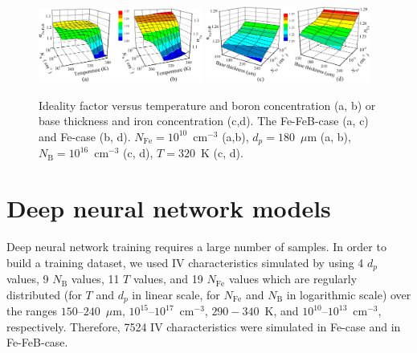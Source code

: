 \documentclass[num-refs]{wiley-article} %
\begin{document}
\begin{figure}[t]
\centering
\includegraphics[width=0.48\textwidth]{Fig2ab}
\includegraphics[width=0.48\textwidth]{Fig2cd}
\caption{Ideality factor versus temperature and boron concentration (a, b)
or base thickness and iron concentration (c,d).
The Fe-FeB-case (a, c) and Fe-case (b, d).
$N_\mathrm{Fe}=10^{10}$~cm$^{-3}$ (a,b),
$d_p=180$~$\mu$m (a, b),
$N_\mathrm{B}=10^{16}$~cm$^{-3}$ (c, d),
$T=320$~K (c, d).
}
\label{fig_nValues}
\end{figure}

\section{Deep neural network models}

Deep neural network training  requires a large number of samples.
In order to build a training dataset, we used IV characteristics
simulated by using 4 $d_p$ values, 9 $N_\mathrm{B}$ values, 11 $T$ values, and 19 $N_{\mathrm{Fe}}$ values
which are regularly distributed
(for $T$ and $d_p$ in linear scale,
for  $N_{\mathrm{Fe}}$ and $N_\mathrm{B}$ in logarithmic scale)
over the  ranges $150$--$240$~$\mu$m, $10^{15}$--$10^{17}$~cm$^{-3}$, $290-340$~K, and
$10^{10}$--$10^{13}$~cm$^{-3}$, respectively.
Therefore, 7524 IV characteristics were simulated in Fe-case and in Fe-FeB-case.
\end{document}
